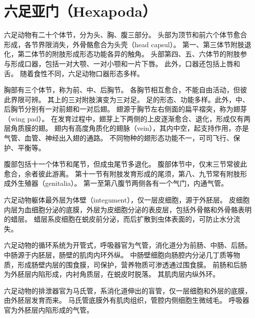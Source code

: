 \documentclass[11pt]{article}
\begin{document}
\section{六足亚门（Hexapoda）}
六足动物有二十个体节，分为头、胸、腹三部分。
头部为顶节和前六个体节愈合形成，各节界限消失，外骨骼愈合为头壳（head capsul）。
第一、第三体节附肢退化，第二体节的附肢形成形态功能各异的触角。
头部第四、五、六体节的附肢参与形成口器，包括一对大颚、一对小颚和一片下唇。
此外，口器还包括上唇和舌。
随着食性不同，六足动物口器形态多样。

\newline

胸部有三个体节，称为前、中、后胸节。
各胸节相互愈合，不能自由活动，但彼此界限可辨。
其上的三对附肢演变为三对足。
足的形态、功能多样。此外，中、后胸节分别有一对前翅和一对后翅。
翅源于胸节左右侧面的扁平褶突，称为翅芽（wing pad）。
在发育过程中，翅芽上下两侧的上皮逐渐愈合、退化，形成仅有两层角质膜的翅。
翅内有高度角质化的翅脉（vein），其内中空，起支持作用，亦是气管、血管、神经出入翅的通路。
不同物种的翅形态功能不一，可司飞行、保护、平衡等。

\newline

腹部包括十一个体节和尾节，但成虫尾节多退化。
腹部体节中，仅末三节常彼此愈合，余者彼此游离。
第十一节有附肢发育形成的尾须，第八、九节常有附肢形成外生殖器（genitalia）。
第一至第八腹节两侧各有一个气门，内通气管。

\newline

六足动物躯体最外层为体壁（integument），仅一层皮细胞，源于外胚层。
皮细胞内层为血细胞分泌的底膜，外层为皮细胞分泌的表皮层，包括外骨骼和外骨骼表明的蜡层。
蜡层系皮细胞在蜕皮前分泌，而后扩散到虫体表面的，可防止水分流失。

\newline

六足动物的循环系统为开管式，呼吸器官为气管，消化道分为前肠、中肠、后肠。
中肠源于内胚层，肠壁的肌肉内环外纵。
中肠壁细胞向肠腔内分泌几丁质等物质，形成肠壁内层的围食膜，司保护，营养物质可渗透通过围食膜。
前肠和后肠为外胚层内陷形成，内衬角质层，在蜕皮时脱落。
其肌肉层内纵外环。

\newline

六足动物的排泄器官为马氏管，系消化道伸出的盲管，仅一层细胞和外层的底膜，由外胚层发育而来。
马氏管底膜外有肌肉组织，管腔内侧细胞生微绒毛。
呼吸器官为外胚层内陷形成的气管。

\newline
\end{document}
